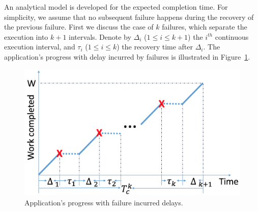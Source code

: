 An analytical model is developed for the expected completion time. For simplicity, we assume that no subsequent failure happens during the recovery of the previous failure. 
First we discuss the case of $k$ failures, which separate the execution into $k+1$ intervals. 
Denote by $\Delta_i$ ($1\le i \le k+1$) the $i^{th}$ continuous execution interval, and $\tau_i$ ($1\le i \le k$) the recovery time after $\Delta_i$. 
The application's progress with delay incurred by failures is illustrated in Figure~\ref{fig:progress}.

\begin{figure}[!t]
	\begin{center}
		\includegraphics[width=0.7\columnwidth]{Figures/progress}
	\end{center}
	\caption{Application's progress with failure incurred delays.}
	\label{fig:progress}
\end{figure}

